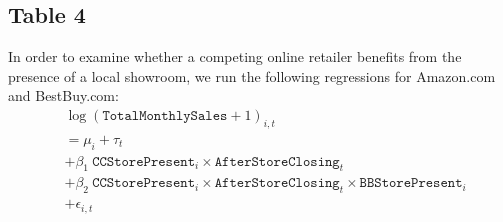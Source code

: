 \documentclass{article}
\begin{document}
\subsection{Table 4}
In order to examine whether a competing online retailer benefits from the presence of a local showroom, we run the following regressions for Amazon.com and BestBuy.com:
\begin{equation}
	\begin{aligned}
		& \log\left( \texttt{TotalMonthlySales} + 1\right)_{i,t} \\ &= \mu_{i} + \tau_{t} 
		\\ &+ \beta_1 \ \texttt{CCStorePresent}_i \times \texttt{AfterStoreClosing}_t 
		\\ &+ \beta_2 \ \texttt{CCStorePresent}_i \times \texttt{AfterStoreClosing}_t \times \texttt{BBStorePresent}_i \\ & + \epsilon_{i,t}
	\end{aligned}
\end{equation}
\end{document}
